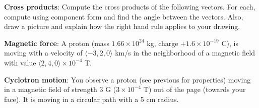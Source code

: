 \documentclass{handout}
\begin{document}
\begin{questions}
    \question \textbf{Cross products}: Compute the cross products of the following vectors. For each, compute using component form and find the angle between the vectors. Also, draw a picture and explain how the right hand rule applies to your drawing.

    \question \textbf{Magnetic force}: A proton (mass $1.66\times 10^{24}$ kg, charge $+1.6\times 10^{-19}$ C), is moving with a velocity of $\langle-3,2,0\rangle$ km/s in the neighborhood of a magnetic field with value $\langle 2,4,0\rangle\times 10^{-4} $ T.

    \question \textbf{Cyclotron motion}: You observe a proton (see previous for properties) moving in a magnetic field of strength 3 G ($3\times 10^{-4}$ T) out of the page (towards your face). It is moving in a circular path with a 5 cm radius.
\end{questions}
\end{document}
